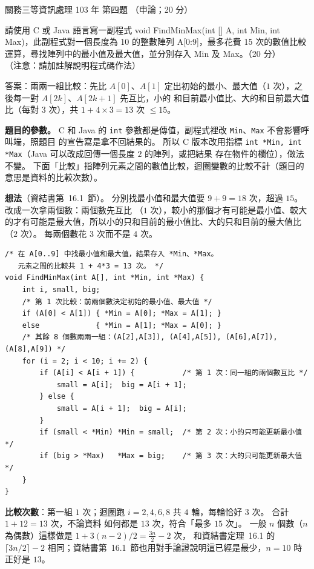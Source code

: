 \begin{pastexam}[label={px:gw3-103-ds-04}]{關務三等資訊處理 103 年 第四題}
（申論；20 分）

請使用 C 或 Java 語言寫一副程式 void FindMinMax(int [] A, int Min, int Max)，此副程式對一個長度為 10 的整數陣列
A[0:9]，最多花費 15 次的數值比較運算，尋找陣列中的最小值及最大值，並分別存入 Min 及 Max。（20 分）\\
（注意：請加註解說明程式碼作法）
\end{pastexam}

\begin{pastsoln}
答案：兩兩一組比較：先比 $A[0]$、$A[1]$ 定出初始的最小、最大值（$1$ 次），之後每一對 $A[2k]$、$A[2k+1]$ 先互比，小的
和目前最小值比、大的和目前最大值比（每對 $3$ 次），共 $1 + 4 \times 3 = 13$ 次 $\le 15$。

\textbf{題目的參數。} C 和 Java 的 \texttt{int} 參數都是傳值，副程式裡改 \texttt{Min}、\texttt{Max} 不會影響呼叫端，照題目
的宣告寫是拿不回結果的。 所以 C 版本改用指標 \texttt{int *Min, int *Max}（Java 可以改成回傳一個長度 $2$ 的陣列，或把結果
存在物件的欄位），做法不變。 下面「比較」指陣列元素之間的數值比較，迴圈變數的比較不計（題目的意思是資料的比較次數）。

\textbf{想法}（資結書第~16.1~節）。 分別找最小值和最大值要 $9 + 9 = 18$ 次，超過 $15$。 改成一次拿兩個數：兩個數先互比
（$1$ 次），較小的那個才有可能是最小值、較大的才有可能是最大值，所以小的只和目前的最小值比、大的只和目前的最大值比
（$2$ 次）。 每兩個數花 $3$ 次而不是 $4$ 次。
\begin{verbatim}
/* 在 A[0..9] 中找最小值和最大值，結果存入 *Min、*Max。
   元素之間的比較共 1 + 4*3 = 13 次。 */
void FindMinMax(int A[], int *Min, int *Max) {
    int i, small, big;
    /* 第 1 次比較：前兩個數決定初始的最小值、最大值 */
    if (A[0] < A[1]) { *Min = A[0]; *Max = A[1]; }
    else             { *Min = A[1]; *Max = A[0]; }
    /* 其餘 8 個數兩兩一組：(A[2],A[3]), (A[4],A[5]), (A[6],A[7]), (A[8],A[9]) */
    for (i = 2; i < 10; i += 2) {
        if (A[i] < A[i + 1]) {           /* 第 1 次：同一組的兩個數互比 */
            small = A[i];  big = A[i + 1];
        } else {
            small = A[i + 1];  big = A[i];
        }
        if (small < *Min) *Min = small;  /* 第 2 次：小的只可能更新最小值 */
        if (big > *Max)   *Max = big;    /* 第 3 次：大的只可能更新最大值 */
    }
}
\end{verbatim}
\textbf{比較次數}：第一組 $1$ 次；迴圈跑 $i = 2, 4, 6, 8$ 共 $4$ 輪，每輪恰好 $3$ 次。 合計 $1 + 12 = 13$ 次，不論資料
如何都是 $13$ 次，符合「最多 $15$ 次」。 一般 $n$ 個數（$n$ 為偶數）這樣做是 $1 + 3(n-2)/2 = \tfrac{3n}{2} - 2$ 次，
和資結書定理~16.1 的 $\lceil 3n/2 \rceil - 2$ 相同；資結書第~16.1~節也用對手論證說明這已經是最少，$n = 10$ 時正好是 $13$。


\end{pastsoln}
